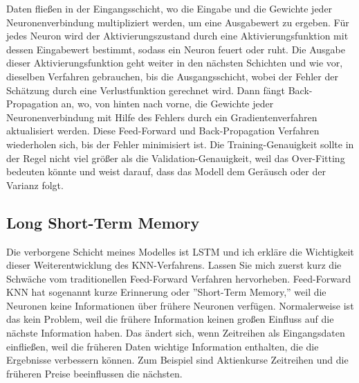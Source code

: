 \documentclass[12pt]{article}
\begin{document}
            Daten fließen in der Eingangsschicht, wo die Eingabe und die Gewichte jeder Neuronenverbindung multipliziert werden, 
            um eine Ausgabewert zu ergeben. 
            Für jedes Neuron wird der Aktivierungszustand durch eine Aktivierungsfunktion mit dessen Eingabewert bestimmt, 
            sodass ein Neuron feuert oder ruht. Die Ausgabe dieser Aktivierungsfunktion geht weiter in den nächsten Schichten und wie vor, 
            dieselben Verfahren gebrauchen, bis die Ausgangsschicht, wobei der Fehler der Schätzung durch eine Verlustfunktion gerechnet wird. 
            Dann fängt Back-Propagation an, wo, von hinten nach vorne, die Gewichte jeder Neuronenverbindung 
            mit Hilfe des Fehlers durch ein Gradientenverfahren aktualisiert werden. 
            Diese Feed-Forward und Back-Propagation Verfahren wiederholen sich, bis der Fehler minimisiert ist. 
            Die Training-Genauigkeit sollte in der Regel nicht viel größer als die Validation-Genauigkeit,
            weil das Over-Fitting bedeuten könnte und weist darauf, dass das Modell dem Geräusch oder der Varianz folgt.

        \subsection{Long Short-Term Memory}

            Die verborgene Schicht meines Modelles ist LSTM und ich erkläre die Wichtigkeit dieser Weiterentwicklung des KNN-Verfahrens. 
            Lassen Sie mich zuerst kurz die Schwäche vom traditionellen Feed-Forward Verfahren hervorheben. 
            Feed-Forward KNN hat sogenannt kurze Erinnerung oder ''Short-Term Memory,''
            weil die Neuronen keine Informationen über frühere Neuronen verfügen. 
            Normalerweise ist das kein Problem, weil die frühere Information keinen großen Einfluss auf die nächste Information haben. 
            Das ändert sich, wenn Zeitreihen als Eingangsdaten einfließen, 
            weil die früheren Daten wichtige Information enthalten, die die Ergebnisse verbessern können. 
            Zum Beispiel sind Aktienkurse Zeitreihen und die früheren Preise beeinflussen die nächsten. 
            
\end{document}

